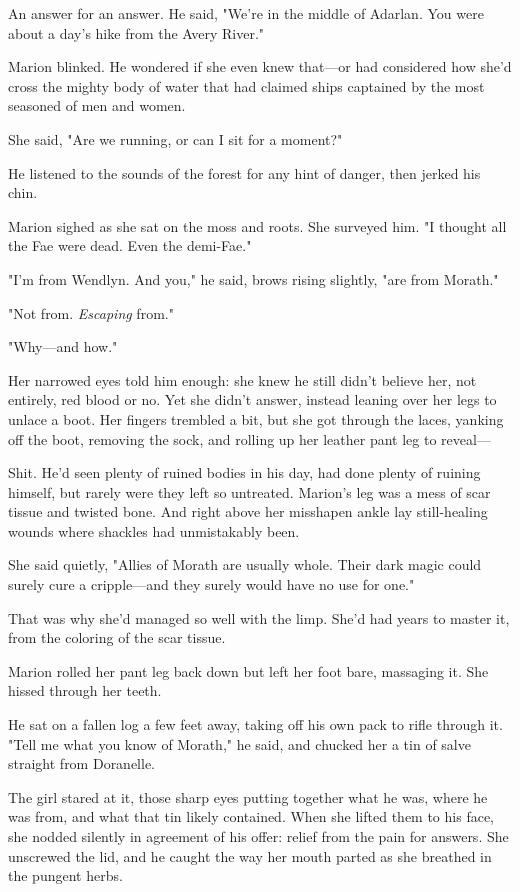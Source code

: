 An answer for an answer.
He said, "We're in the middle of Adarlan.
You were about a day's hike from the Avery River."

Marion blinked.
He wondered if she even knew that---or had considered how she'd cross the mighty body of water that had claimed ships captained by the most seasoned of men and women.

She said, "Are we running, or can I sit for a moment?"

He listened to the sounds of the forest for any hint of danger, then jerked his chin.

Marion sighed as she sat on the moss and roots.
She surveyed him.
"I thought all the Fae were dead.
Even the demi-Fae."

"I'm from Wendlyn.
And you," he said, brows rising slightly, "are from Morath."

"Not from.
\emph{Escaping} from."

"Why---and how."

Her narrowed eyes told him enough: she knew he still didn't believe her, not entirely, red blood or no.
Yet she didn't answer, instead leaning over her legs to unlace a boot.
Her fingers trembled a bit, but she got through the laces, yanking off the boot, removing the sock, and rolling up her leather pant leg to reveal---

Shit.
He'd seen plenty of ruined bodies in his day, had done plenty of ruining himself, but rarely were they left so untreated.
Marion's leg was a mess of scar tissue and twisted bone.
And right above her misshapen ankle lay still-healing wounds where shackles had unmistakably been.

She said quietly, "Allies of Morath are usually whole.
Their dark magic could surely cure a cripple---and they surely would have no use for one."

That was why she'd managed so well with the limp.
She'd had years to master it, from the coloring of the scar tissue.

Marion rolled her pant leg back down but left her foot bare, massaging it.
She hissed through her teeth.

He sat on a fallen log a few feet away, taking off his own pack to rifle through it.
"Tell me what you know of Morath," he said, and chucked her a tin of salve straight from Doranelle.

The girl stared at it, those sharp eyes putting together what he was, where he was from, and what that tin likely contained.
When she lifted them to his face, she nodded silently in agreement of his offer: relief from the pain for answers.
She unscrewed the lid, and he caught the way her mouth parted as she breathed in the pungent herbs.

